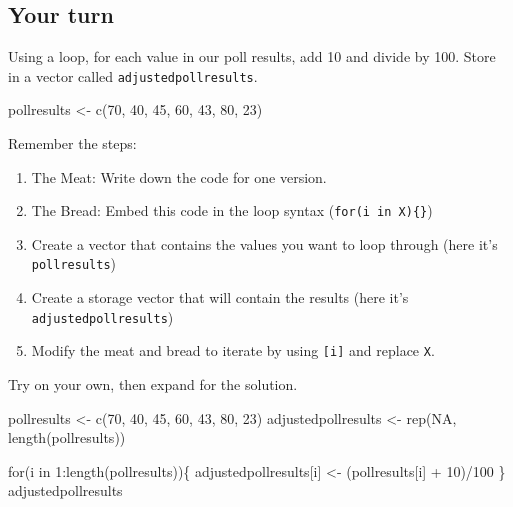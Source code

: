 \documentclass[
  letterpaper,
  DIV=11,
  numbers=noendperiod]{scrreprt}
\newenvironment{Shaded}{\begin{snugshade}}{\end{snugshade}}
\newcommand{\ConstantTok}[1]{\textcolor[rgb]{0.56,0.35,0.01}{#1}}
\newcommand{\ControlFlowTok}[1]{\textcolor[rgb]{0.00,0.23,0.31}{#1}}
\newcommand{\DecValTok}[1]{\textcolor[rgb]{0.68,0.00,0.00}{#1}}
\newcommand{\FunctionTok}[1]{\textcolor[rgb]{0.28,0.35,0.67}{#1}}
\newcommand{\NormalTok}[1]{\textcolor[rgb]{0.00,0.23,0.31}{#1}}
\newcommand{\OtherTok}[1]{\textcolor[rgb]{0.00,0.23,0.31}{#1}}
\newcommand{\SpecialCharTok}[1]{\textcolor[rgb]{0.37,0.37,0.37}{#1}}
\providecommand{\tightlist}{%
  \setlength{\itemsep}{0pt}\setlength{\parskip}{0pt}}\usepackage{longtable,booktabs,array}
\begin{document}
\hypertarget{your-turn}{%
\subsection{Your turn}\label{your-turn}}

Using a loop, for each value in our poll results, add 10 and divide by
100. Store in a vector called \texttt{adjustedpollresults}.

\begin{Shaded}
\begin{Highlighting}[]
\NormalTok{pollresults }\OtherTok{\textless{}{-}} \FunctionTok{c}\NormalTok{(}\DecValTok{70}\NormalTok{, }\DecValTok{40}\NormalTok{, }\DecValTok{45}\NormalTok{, }\DecValTok{60}\NormalTok{, }\DecValTok{43}\NormalTok{, }\DecValTok{80}\NormalTok{, }\DecValTok{23}\NormalTok{)}
\end{Highlighting}
\end{Shaded}

Remember the steps:

\begin{enumerate}
\def\labelenumi{\arabic{enumi}.}
\tightlist
\item
  The Meat: Write down the code for one version.
\item
  The Bread: Embed this code in the loop syntax
  (\texttt{for(i\ in\ X)\{\}})
\item
  Create a vector that contains the values you want to loop through
  (here it's \texttt{pollresults})
\item
  Create a storage vector that will contain the results (here it's
  \texttt{adjustedpollresults})
\item
  Modify the meat and bread to iterate by using \texttt{{[}i{]}} and
  replace \texttt{X}.
\end{enumerate}

Try on your own, then expand for the solution.

\begin{Shaded}
\begin{Highlighting}[]
\NormalTok{pollresults }\OtherTok{\textless{}{-}} \FunctionTok{c}\NormalTok{(}\DecValTok{70}\NormalTok{, }\DecValTok{40}\NormalTok{, }\DecValTok{45}\NormalTok{, }\DecValTok{60}\NormalTok{, }\DecValTok{43}\NormalTok{, }\DecValTok{80}\NormalTok{, }\DecValTok{23}\NormalTok{)}
\NormalTok{adjustedpollresults }\OtherTok{\textless{}{-}} \FunctionTok{rep}\NormalTok{(}\ConstantTok{NA}\NormalTok{, }\FunctionTok{length}\NormalTok{(pollresults))}

\ControlFlowTok{for}\NormalTok{(i }\ControlFlowTok{in} \DecValTok{1}\SpecialCharTok{:}\FunctionTok{length}\NormalTok{(pollresults))\{}
\NormalTok{  adjustedpollresults[i] }\OtherTok{\textless{}{-}}\NormalTok{ (pollresults[i] }\SpecialCharTok{+} \DecValTok{10}\NormalTok{)}\SpecialCharTok{/}\DecValTok{100} 
\NormalTok{\}}
\NormalTok{adjustedpollresults}
\end{Highlighting}
\end{Shaded}
\end{document}
